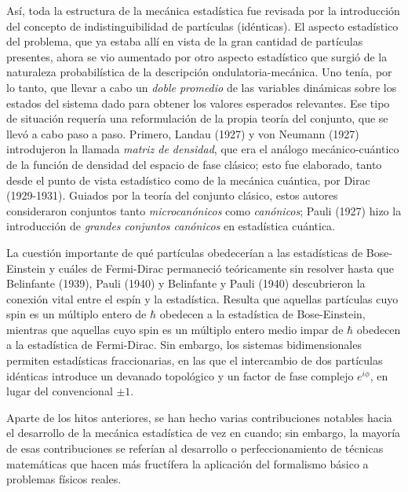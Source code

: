 \par
Así, toda la estructura de la mecánica estadística fue revisada por la introducción del concepto de indistinguibilidad de partículas (idénticas). El aspecto estadístico del problema, que ya estaba allí en vista de la gran cantidad de partículas presentes, ahora se vio aumentado por otro aspecto estadístico que surgió de la naturaleza probabilística de la descripción ondulatoria-mecánica. Uno tenía, por lo tanto, que llevar a cabo un \emph{doble promedio} de las variables dinámicas sobre los estados del sistema dado para obtener los valores esperados relevantes. Ese tipo de situación requería una reformulación de la propia teoría del conjunto, que se llevó a cabo paso a paso. Primero, Landau (1927) y von Neumann (1927) introdujeron la llamada \emph{matriz de densidad}, que era el análogo mecánico-cuántico de la función de densidad del espacio de fase clásico; esto fue elaborado, tanto desde el punto de vista estadístico como de la mecánica cuántica, por Dirac (1929-1931). Guiados por la teoría del conjunto clásico, estos autores consideraron conjuntos tanto \emph{microcanónicos} como \emph{canónicos}; Pauli (1927) hizo la introducción de \emph{grandes conjuntos canónicos} en estadística cuántica.
\par
La cuestión importante de qué partículas obedecerían a las estadísticas de Bose-Einstein y cuáles de Fermi-Dirac permaneció teóricamente sin resolver hasta que Belinfante (1939), Pauli (1940) y Belinfante y Pauli (1940) descubrieron la conexión vital entre el espín y la estadística. Resulta que aquellas partículas cuyo spin es un múltiplo entero de $\hbar$ obedecen a la estadística de Bose-Einstein, mientras que aquellas cuyo spin es un múltiplo entero medio impar de $\hbar$ obedecen a la estadística de Fermi-Dirac. Sin embargo, los sistemas bidimensionales permiten estadísticas fraccionarias, en las que el intercambio de dos partículas idénticas introduce un devanado topológico y un factor de fase complejo $e^{i \phi}$, en lugar del convencional $\pm 1$.
\par
Aparte de los hitos anteriores, se han hecho varias contribuciones notables hacia el desarrollo de la mecánica estadística de vez en cuando; sin embargo, la mayoría de esas contribuciones se referían al desarrollo o perfeccionamiento de técnicas matemáticas que hacen más fructífera la aplicación del formalismo básico a problemas físicos reales.


